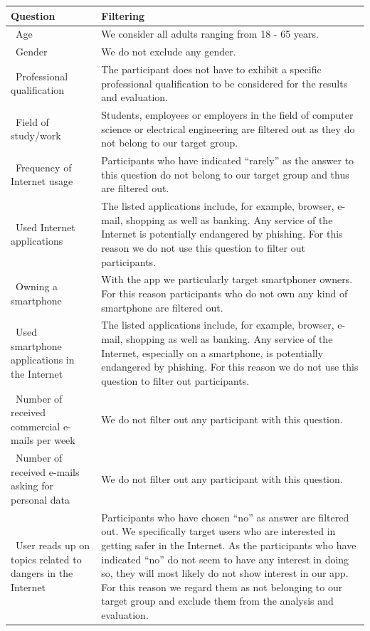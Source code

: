 \begin{center}
    \begin{tabular}{ | p{5cm} | p{10cm} |}
    \hline\textbf{Question} & \textbf{Filtering}  \\  \hline
		\hline\  Age & We consider all adults ranging from 18 - 65 years. \\
    \hline\  Gender & We do not exclude any gender. \\ 
    \hline\  Professional qualification & The participant does not have to exhibit a specific professional qualification to be considered for the results and evaluation. \\ 
		\hline\  Field of study/work & Students, employees or employers in the field of computer science or electrical engineering are filtered out as they do not belong to our target group. \\ 
	  \hline\ Frequency of Internet usage & Participants who have indicated ``rarely'' as the answer to this question do not belong to our target group and thus are filtered out. \\ 
	  \hline\ Used Internet applications  &  The listed applications include, for example, browser, e-mail, shopping as well as banking. Any service of the Internet is potentially endangered by phishing. For this reason we do not use this question to filter out participants.\\ 
    \hline\ Owning a smartphone  & With the app we particularly target smartphoner owners. For this reason participants who do not own any kind of smartphone are filtered out. \\
		\hline\ Used smartphone applications in the Internet  & The listed applications include, for example, browser, e-mail, shopping as well as banking. Any service of the Internet, especially on a smartphone, is potentially endangered by phishing. For this reason we do not use this question to filter out participants. \\
    \hline\ Number of received commercial e-mails per week  & We do not filter out any participant with this question. \\
    \hline\ Number of received e-mails asking for personal data  & We do not filter out any participant with this question. \\
    \hline\ User reads up on topics related to dangers in the Internet  &  Participants who have chosen ``no'' as answer are filtered out. We specifically target users who are interested in getting safer in the Internet. As the participants who have indicated ``no'' do not seem to have any interest in doing so, they will most likely do not show interest in our app. For this reason we regard them as not belonging to our target group and exclude them from the analysis and evaluation.\\

\end{tabular}
\end{center}
